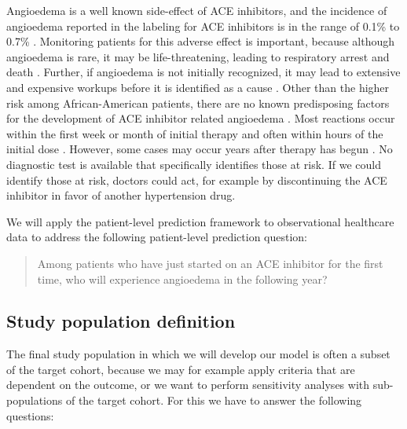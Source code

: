 \documentclass[11pt]{book}
\theoremstyle{definition}
\theoremstyle{definition}
\theoremstyle{definition}
\theoremstyle{remark}
\begin{document}
Angioedema is a well known side-effect of ACE inhibitors, and the incidence of angioedema reported in the labeling for ACE inhibitors is in the range of 0.1\% to 0.7\% \citep{byrd_2006}. Monitoring patients for this adverse effect is important, because although angioedema is rare, it may be life-threatening, leading to respiratory arrest and death \citep{norman_2013}. Further, if angioedema is not initially recognized, it may lead to extensive and expensive workups before it is identified as a cause \citep{norman_2013, thompson_1993}. Other than the higher risk among African-American patients, there are no known predisposing factors for the development of ACE inhibitor related angioedema \citep{byrd_2006}. Most reactions occur within the first week or month of initial therapy and often within hours of the initial dose \citep{circardi_2004}. However, some cases may occur years after therapy has begun \citep{mara_1996}. No diagnostic test is available that specifically identifies those at risk. If we could identify those at risk, doctors could act, for example by discontinuing the ACE inhibitor in favor of another hypertension drug.  

We will apply the patient-level prediction framework to observational healthcare data to address the following patient-level prediction question:

\begin{quote}
Among patients who have just started on an ACE inhibitor for the first time, who will experience angioedema in the following year?
\end{quote}

\hypertarget{study-population-definition}{%
\subsection{Study population definition}\label{study-population-definition}}

The final study population in which we will develop our model is often a subset of the target cohort, because we may for example apply criteria that are dependent on the outcome, or we want to perform sensitivity analyses with sub-populations of the target cohort. For this we have to answer the following questions:
\end{document}
